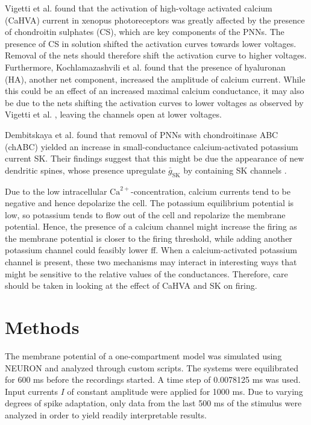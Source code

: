\documentclass[times, twoside]{zHenriquesLab-StyleBioRxiv}
\begin{document}
Vigetti et al. \cite{vigetti_chondroitin_2008} found that the activation of high-voltage activated calcium (CaHVA) current in xenopus photoreceptors was greatly affected by the presence of chondroitin sulphates (CS), which are key components of the PNNs. The presence of CS in solution shifted the activation curves towards lower voltages. Removal of the nets should therefore shift the activation curve to higher voltages. Furthermore, Kochlamazashvili et al. \cite{kochlamazashvili_extracellular_2010} found that the presence of hyaluronan (HA), another net component, increased the amplitude of calcium current. While this could be an effect of an increased maximal calcium conductance, it may also be due to the nets shifting the activation curves to lower voltages as observed by Vigetti et al. \cite{vigetti_chondroitin_2008}, leaving the channels open at lower voltages.

Dembitskaya et al. \cite{dembitskaya_attenuation_2021} found that removal of PNNs with chondroitinase ABC (chABC) yielded an increase in small-conductance calcium-activated potassium current SK. Their findings suggest that this might be due the appearance of new dendritic spines, whose presence upregulate $\bar{g}_\text{SK}$ by containing  SK channels \cite{dembitskaya_attenuation_2021}.

Due to the low intracellular $\text{Ca}^{2+}$-concentration, calcium currents tend to be negative and hence depolarize the cell. The potassium equilibrium potential is low, so potassium tends to flow out of the cell and repolarize the membrane potential. Hence, the presence of a calcium channel might increase the firing as the membrane potential is closer to the firing threshold, while adding another potassium channel could feasibly lower ff. When a calcium-activated potassium channel is present, these two mechanisms may interact in interesting ways that might be sensitive to the relative values of the conductances. Therefore, care should be taken in looking at the effect of CaHVA and SK on firing. %

\section*{Methods} \label{sec:methods}

The membrane potential of a one-compartment model was simulated using NEURON and analyzed through custom scripts. The systems were equilibrated for 600 ms before the recordings started. A time step of 0.0078125 ms was used. %
Input currents $I$ of constant amplitude were applied for 1000 ms. %
Due to varying degrees of spike adaptation, only data from the last 500 ms of the stimulus were analyzed in order to yield readily interpretable results. %
\end{document}
